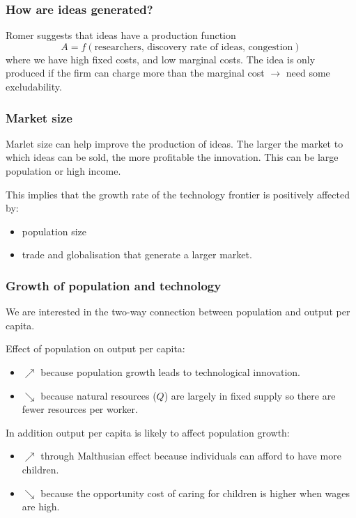 \documentclass[11pt]{article}
\begin{document}
\subsubsection{How are ideas generated?}
Romer \cite{romer1990} suggests that ideas have a production function
\[A = f(\text{researchers, discovery rate of ideas, congestion})\]
where we have high fixed costs, and low marginal costs. The idea is only produced if the firm can charge more than the marginal cost $\rightarrow$ need some excludability.

\subsubsection{Market size}
Marlet size can help improve the production of ideas. The larger the market to which ideas can be sold, the more profitable the innovation. This can be large population or high income.

This implies that the growth rate of the technology frontier is positively affected by:
\begin{itemize}
    \item population size
    \item trade and globalisation that generate a larger market.
\end{itemize}


\subsubsection{Growth of population and technology}
We are interested in the two-way connection between population and output per capita.

Effect of population on output per capita:
\begin{itemize}
    \item $\nearrow$ because population growth leads to technological innovation.
    \item $\searrow$ because natural resources ($Q$) are largely in fixed supply so there are fewer resources per worker.
\end{itemize}

In addition output per capita is likely to affect population growth:
\begin{itemize}
    \item $\nearrow$ through Malthusian effect because individuals can afford to have more children.
    \item $\searrow$ because the opportunity cost of caring for children is higher when wages are high.
\end{itemize}
\end{document}
